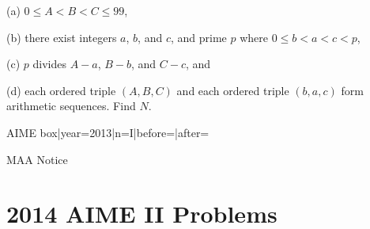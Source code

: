\documentclass{article}
\begin{document}
\begin{enumerate}[label=\arabic*., itemsep=0.5em]
(a) \(0\le A<B<C\le99\), 

(b) there exist integers \(a\), \(b\), and \(c\), and prime \(p\) where \(0\le b<a<c<p\), 

(c) \(p\) divides \(A-a\), \(B-b\), and \(C-c\), and 

(d) each ordered triple \((A,B,C)\) and each ordered triple \((b,a,c)\) form arithmetic sequences. Find \(N\).



{{AIME box|year=2013|n=I|before=|after=}}

{{MAA Notice}}\par \vspace{0.5em}\end{enumerate}\newpage\section*{2014 AIME II Problems}
\end{document}
